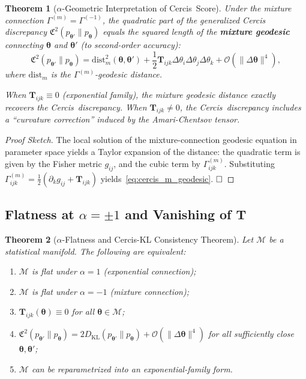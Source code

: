 \documentclass[12pt,a4paper]{article}
\theoremstyle{plain}
\newtheorem{theorem}{Theorem}
\theoremstyle{definition}
\theoremstyle{remark}
\newcommand{\Cercis}{\textsf{Cercis}}
\newcommand{\MM}{\mathcal{M}}
\newcommand{\DKL}{D_{\mathrm{KL}}}
\newcommand{\CercisScore}{\mathfrak{C}}
\newcommand{\ACT}{\mathbf{T}}    %
\begin{document}
\begin{theorem}[$\alpha$-Geometric Interpretation of \Cercis\ Score]
\label{thm:cercis_alpha}
Under the mixture connection $\Gamma^{(m)} = \Gamma^{(-1)}$, the quadratic part of the generalized Cercis discrepancy $\CercisScore^2(p_{\bm{\theta}'} \| p_{\bm{\theta}})$ equals the squared length of the \textbf{mixture geodesic} connecting $\bm{\theta}$ and $\bm{\theta}'$ (to second-order accuracy):
\begin{equation}\label{eq:cercis_m_geodesic}
    \CercisScore^2(p_{\bm{\theta}'} \| p_{\bm{\theta}})
    = \mathrm{dist}_{m}^2(\bm{\theta}, \bm{\theta}') + \frac{1}{2} \ACT_{ijk} \Delta\theta_i \Delta\theta_j \Delta\theta_k + \mathcal{O}(\|\Delta\bm{\theta}\|^4),
\end{equation}
where $\mathrm{dist}_{m}$ is the $\Gamma^{(m)}$-geodesic distance.

When $\ACT_{ijk} \equiv 0$ (exponential family), the mixture geodesic distance exactly recovers the \Cercis\ discrepancy. When $\ACT_{ijk} \neq 0$, the \Cercis\ discrepancy includes a ``curvature correction'' induced by the Amari-Chentsov tensor.
\end{theorem}

\begin{proof}[Proof Sketch]
The local solution of the mixture-connection geodesic equation in parameter space yields a Taylor expansion of the distance: the quadratic term is given by the Fisher metric $g_{ij}$, and the cubic term by $\Gamma^{(m)}_{ijk}$. Substituting $\Gamma^{(m)}_{ijk} = \frac{1}{2}(\partial_k g_{ij} + \ACT_{ijk})$ yields~\eqref{eq:cercis_m_geodesic}. $\hfill\square$
\end{proof}

\subsection{Flatness at $\alpha = \pm 1$ and Vanishing of $\ACT$}

\begin{theorem}[$\alpha$-Flatness and \Cercis-KL Consistency Theorem]
\label{thm:flatness_consistency}
Let $\MM$ be a statistical manifold. The following are equivalent:

\begin{enumerate}[label=(\roman*), leftmargin=*]
    \item $\MM$ is flat under $\alpha = 1$ (exponential connection);
    \item $\MM$ is flat under $\alpha = -1$ (mixture connection);
    \item $\ACT_{ijk}(\bm{\theta}) \equiv 0$ for all $\bm{\theta} \in \MM$;
    \item $\CercisScore^2(p_{\bm{\theta}'} \| p_{\bm{\theta}}) = 2\DKL(p_{\bm{\theta}'} \| p_{\bm{\theta}}) + \mathcal{O}(\|\Delta\bm{\theta}\|^4)$ for all sufficiently close $\bm{\theta}, \bm{\theta}'$;
    \item $\MM$ can be reparametrized into an exponential-family form.
\end{enumerate}
\end{theorem}
\end{document}
